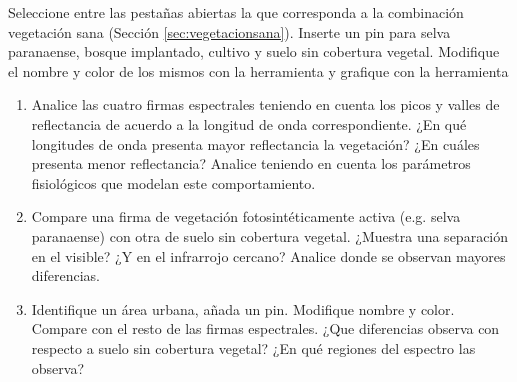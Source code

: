 \begin{enumerate}
\begin{enumerate}
\begin{enumerate}
  \end{enumerate}

  \item Seleccione entre las pestañas abiertas la que corresponda a la combinación vegetación sana (Sección \ref{sec:vegetacionsana}). Inserte un pin para selva paranaense, bosque implantado, cultivo y suelo sin cobertura vegetal. Modifique el nombre y color de los mismos con la herramienta  y grafique con la herramienta 
  \begin{enumerate}
    \item Analice las cuatro firmas espectrales teniendo en cuenta los picos y valles de reflectancia de acuerdo a la longitud de onda correspondiente. ¿En qué longitudes de onda presenta mayor reflectancia la vegetación? ¿En cuáles presenta menor reflectancia? Analice teniendo en cuenta los parámetros fisiológicos que modelan este comportamiento.
    \item Compare una firma de vegetación fotosintéticamente activa (e.g. selva paranaense) con otra de suelo sin cobertura vegetal. ¿Muestra una separación en el visible? ¿Y en el infrarrojo cercano? Analice donde se observan mayores diferencias.
	\item Identifique un área urbana, añada un pin. Modifique nombre y color. Compare con el resto de las firmas espectrales. ¿Que diferencias observa con respecto a suelo sin cobertura vegetal? ¿En qué regiones del espectro las observa? 
  \end{enumerate}
  
 